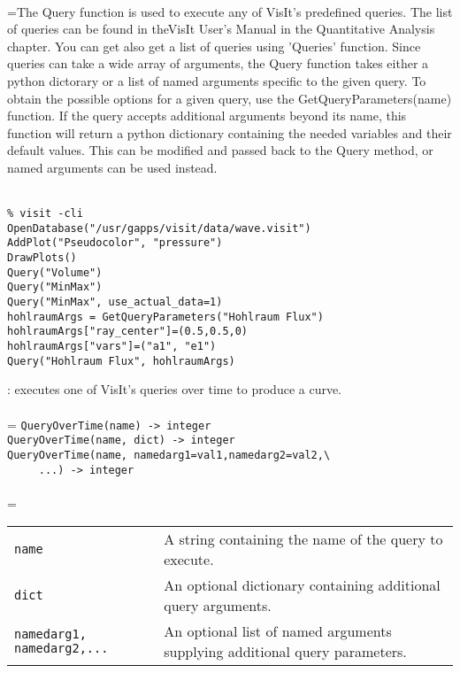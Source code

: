 \documentclass[10pt,a4paper]{report}
\begin{document}
 \\ 
\hangindent=\parindent The Query function is used to execute any of VisIt's predefined queries. The list of queries can be found in theVisIt User's Manual in the Quantitative Analysis chapter. You can get also get a list of queries using 'Queries' function. Since queries can take a wide array of arguments, the Query function takes  either a python dictorary or a list of named arguments specific to the  given query.  To obtain the possible options for a given query, use the  GetQueryParameters(name) function.  If the query accepts additional  arguments beyond its name, this function will return a python dictionary containing the needed variables and their default values.  This can be modified and passed back to the Query method, or named arguments can be used instead. \\[-3mm] 

\\[-6mm]
\begin{verbatim}% visit -cli
OpenDatabase("/usr/gapps/visit/data/wave.visit")
AddPlot("Pseudocolor", "pressure")
DrawPlots()
Query("Volume")
Query("MinMax")
Query("MinMax", use_actual_data=1)
hohlraumArgs = GetQueryParameters("Hohlraum Flux")
hohlraumArgs["ray_center"]=(0.5,0.5,0)
hohlraumArgs["vars"]=("a1", "e1")
Query("Hohlraum Flux", hohlraumArgs)
\end{verbatim}
\newpage


{}
: executes one of VisIt's queries over time to produce a curve.\\[-3mm]

 \\ 
\hangindent=\parindent 
\verb!QueryOverTime(name) -> integer!\\ 
\verb!QueryOverTime(name, dict) -> integer!\\
\verb!QueryOverTime(name, namedarg1=val1,namedarg2=val2,\ ! \\ 
\verb!     ...) -> integer!\\ [-3mm]

 \\ 
\hangindent=\parindent 
\begin{tabular}{lp{9cm}}
\verb!name! & A string containing the name of the query to execute. \\
\verb!dict! & An optional dictionary containing additional query arguments. \\
\verb!namedarg1, namedarg2,...! & An optional list of named arguments supplying additional query parameters. \\
\end{tabular} \\[-2mm]
\end{document}
